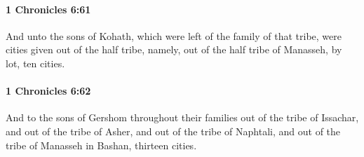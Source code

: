 		\paragraph{1 Chronicles 6:61} %
			\label{1CHRONICLES-6-61}

			And unto the sons of Kohath, which were left of the family of that tribe, were cities given out of the half tribe, namely, out of the half tribe of Manasseh, by lot, ten cities.


		\paragraph{1 Chronicles 6:62} %
			\label{1CHRONICLES-6-62}

			And to the sons of Gershom throughout their families out of the tribe of Issachar, and out of the tribe of Asher, and out of the tribe of Naphtali, and out of the tribe of Manasseh in Bashan, thirteen cities.

